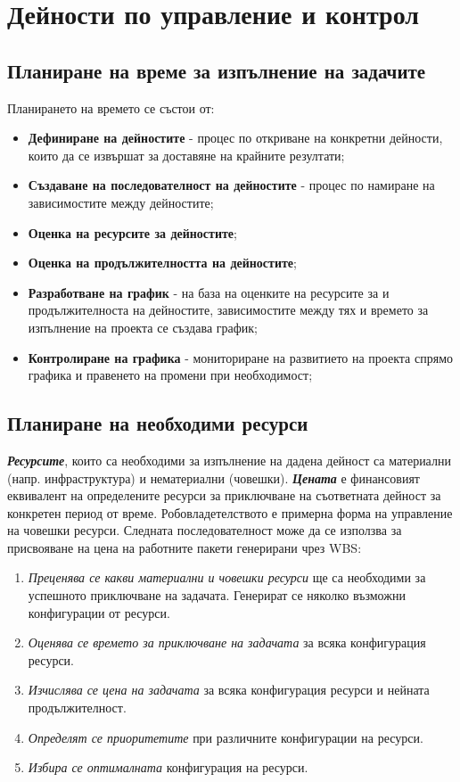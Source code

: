 \documentclass[fleqn,12pt]{article}
\begin{document}
\section{Дейности по управление и контрол}

\subsection{Планиране на време за изпълнение на задачите}

Планирането на времето се състои от:
\begin{itemize}
    \item \textbf{Дефиниране на дейностите} - процес по откриване на конкретни дейности, които да се извършат за доставяне на крайните резултати;
    \item \textbf{Създаване на последователност на дейностите} - процес по намиране на зависимостите между дейностите;
    \item \textbf{Оценка на ресурсите за дейностите};
    \item \textbf{Оценка на продължителността на дейностите};
    \item \textbf{Разработване на график} - на база на оценките на ресурсите за и продължителноста на дейностите, зависимостите между тях и времето за изпълнение на проекта се създава график;
    \item \textbf{Контролиране на графика} - мониториране на развитието на проекта спрямо графика и правенето на промени при необходимост;
\end{itemize}

\subsection{Планиране на необходими ресурси}

\textit{\textbf{Ресурсите}}, които са необходими за изпълнение на дадена дейност са материални (напр. инфраструктура) и нематериални (човешки).
\textit{\textbf{Цената}} е финансовият еквивалент на определените ресурси за приключване на съответната дейност за конкретен период от време.
Робовладетелството е примерна форма на управление на човешки ресурси.
\bigbreak
Следната последователност може да се използва за присвояване на цена на работните пакети генерирани чрез WBS:
\begin{enumerate}
    \item \textit{Преценява се какви материални и човешки ресурси} ще са необходими за успешното приключване на задачата.
    Генерират се няколко възможни конфигурации от ресурси.
    \item \textit{Оценява се времето за приключване на задачата} за всяка конфигурация ресурси.
    \item \textit{Изчислява се цена на задачата} за всяка конфигурация ресурси и нейната продължителност.
    \item \textit{Определят се приоритетите} при различните конфигурации на ресурси.
    \item \textit{Избира се оптималната} конфигурация на ресурси.
\end{enumerate}
\end{document}
